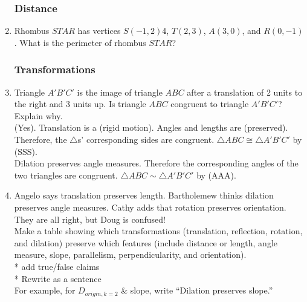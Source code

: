\documentclass[12pt, twoside]{article}
\begin{document}
\begin{enumerate}
    \subsubsection*{Distance}

    \item Rhombus $STAR$ has vertices $S(-1,2)$4, $T(2,3)$, $A(3,0)$, and $R(0,-1)$. What is the perimeter of rhombus $STAR$?

    \subsubsection*{Transformations}
    \item Triangle $A'B'C'$ is the image of triangle $ABC$ after a translation of 2 units to the right and 3 units up. Is triangle $ABC$ congruent to triangle $A'B'C'$? Explain why.\\
    (Yes). Translation is a (rigid motion). Angles and lengths are (preserved). Therefore, the $\triangle$s’ corresponding sides are congruent. $\triangle ABC \cong \triangle A'B'C'$ by (SSS).\\

    Dilation preserves angle measures. Therefore the corresponding angles of the two triangles are congruent. $\triangle ABC \sim \triangle A'B'C'$  by (AAA).

    \item Angelo says translation preserves length. Bartholemew thinks dilation preserves angle measures. Cathy adds that rotation preserves orientation. They are all right, but Doug is confused! \\[0.5cm]
    Make a table showing which transformations (translation, reflection, rotation, and dilation) preserve which features (include distance or length, angle measure, slope, parallelism, perpendicularity, and orientation).\\
    * add true/false claims\\
    * Rewrite as a sentence\\
     For example, for $D_{origin, k=2}$ \& slope, write “Dilation preserves slope.”



  \end{enumerate}
\end{document}
